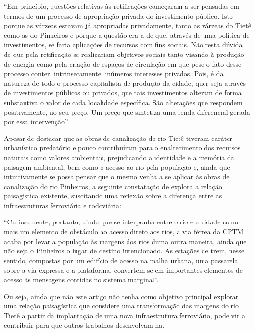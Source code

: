 \documentclass[
article,			%
11pt,				%
oneside,			%
a4paper,			%
english,			%
brazil,				%
sumario=tradicional
]{abntex2}
\begin{document}
	\begin{citacao}
		``Em princípio, questões relativas às retificações começaram a ser pensadas em termos de um processo de apropriação privada do investimento público. Isto porque as várzeas estavam já apropriadas privadamente, tanto as várzeas do Tietê como as do Pinheiros e porque a questão era a de que, através de uma política de investimentos, se faria aplicações de recursos com fins sociais. Não resta dúvida de que pela retificação se realizariam objetivos sociais tanto visando à produção de energia como pela criação de espaços de circulação em que pese o fato desse processo conter, intrinsecamente, inúmeros interesses privados. Pois, é da natureza de todo o processo capitalista de produção da cidade, quer seja através de investimentos públicos ou privados, que tais investimentos alteram de forma substantiva o valor de cada localidade específica. São alterações que respondem positivamente, no seu preço. Um preço que sintetiza uma renda diferencial gerada por essa intervenção''.
	\end{citacao}
	
	Apesar de  destacar que as obras de canalização do rio Tietê tiveram caráter urbanístico predatório e pouco contribuíram para o enaltecimento dos recursos naturais como valores ambientais, prejudicando a identidade e a memória da paisagem ambiental, bem como o acesso ao rio pela população e, ainda que intuitivamente se possa pensar que o mesmo venha a se aplicar às obras de canalização do rio Pinheiros, a seguinte constatação de  explora a relação paisagística existente, suscitando uma reflexão sobre a diferença entre as infraestruturas ferroviária e rodoviária:
	
	\begin{citacao}
		``Curiosamente, portanto, ainda que se interponha entre o rio e a cidade como mais um elemento de obstáculo ao acesso direto aos rios, a via férrea da CPTM acaba por levar a população às margens dos rios duma outra maneira, ainda que não seja o Pinheiros o lugar de destino intencionado. As estações de trem, nesse sentido, compostas por um edifício de acesso na malha urbana, uma passarela sobre a via expressa e a plataforma, convertem-se em importantes elementos de acesso às mensagens contidas no sistema marginal''.
	\end{citacao}
	
	Ou seja, ainda que não este artigo não tenha como objetivo principal explorar uma relação paisagística que considere uma transformação das margens do rio Tietê a partir da implantação de uma nova infraestrutura ferroviário, pode vir a contribuir para que outros trabalhos desenvolvam-na.
	
\end{document}
